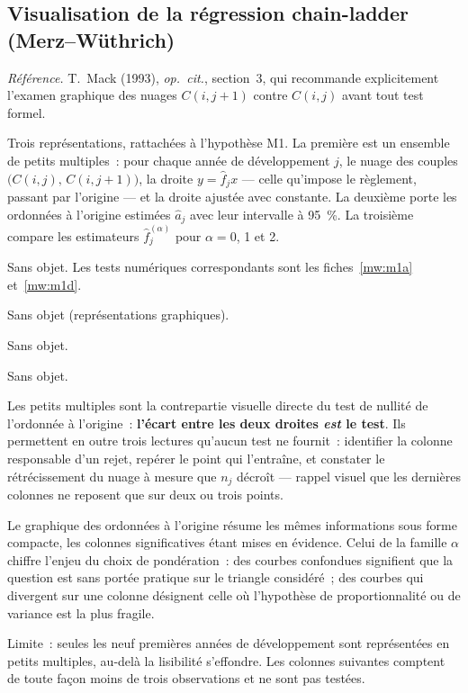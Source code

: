 \documentclass[a4paper,11pt]{article}
\newcommand{\refl}[1]{{\small\textcolor{maincolor!70!black}{\textit{Référence.} #1}}\par\smallskip}
\newcounter{ficheid}
\newenvironment{fiche}[1]{%
  \stepcounter{ficheid}%
  \phantomsection
  \subsection{#1}%
  \label{fiche:\theficheid}%
}{%
  \end{description}\vspace{0.5em}%
}
\newcommand{\Cadre}{%
  \begin{description}[leftmargin=0pt, style=unboxed, itemsep=3pt, topsep=3pt, parsep=2pt]%
  \item[\textcolor{financeblue}{\textbf{1. Cadre, notations et hypothèses de validité (non testées).}}]}
\newcommand{\Hzero}{\item[\textcolor{financeblue}{\textbf{2. Hypothèse nulle.}}]}
\newcommand{\Stat}{\item[\textcolor{financeblue}{\textbf{3. Statistique de test.}}]}
\newcommand{\Loi}{\item[\textcolor{financeblue}{\textbf{4. Loi sous $H_0$.}}]}
\newcommand{\Pval}{\item[\textcolor{financeblue}{\textbf{5. p-value.}}]}
\newcommand{\Usage}{\item[\textcolor{financeblue}{\textbf{6. Usage et limites.}}]}
\begin{document}
\begin{fiche}{Visualisation de la régression chain-ladder (Merz--Wüthrich)}
\label{sec:graph-mw}
\refl{T.~Mack (1993), \emph{op.\ cit.}, section~3, qui recommande explicitement
l'examen graphique des nuages $C(i,j+1)$ contre $C(i,j)$ avant tout test formel.}
\Cadre
Trois représentations, rattachées à l'hypothèse M1. La première est un ensemble
de petits multiples~: pour chaque année de développement $j$, le nuage des
couples $\big(C(i,j),\,C(i,j+1)\big)$, la droite $y = \hat f_j x$ --- celle
qu'impose le règlement, passant par l'origine --- et la droite ajustée avec
constante. La deuxième porte les ordonnées à l'origine estimées $\hat a_j$ avec
leur intervalle à 95~\%. La troisième compare les estimateurs
$\hat f_j^{(\alpha)}$ pour $\alpha = 0$, 1 et 2.
\Hzero
Sans objet. Les tests numériques correspondants sont les fiches~\ref{mw:m1a}
et~\ref{mw:m1d}.
\Stat
Sans objet (représentations graphiques).
\Loi
Sans objet.
\Pval
Sans objet.
\Usage
Les petits multiples sont la contrepartie visuelle directe du test de nullité de
l'ordonnée à l'origine~: \textbf{l'écart entre les deux droites \emph{est} le
test}. Ils permettent en outre trois lectures qu'aucun test ne fournit~:
identifier la colonne responsable d'un rejet, repérer le point qui l'entraîne, et
constater le rétrécissement du nuage à mesure que $n_j$ décroît --- rappel visuel
que les dernières colonnes ne reposent que sur deux ou trois points.

\medskip
Le graphique des ordonnées à l'origine résume les mêmes informations sous forme
compacte, les colonnes significatives étant mises en évidence. Celui de la
famille $\alpha$ chiffre l'enjeu du choix de pondération~: des courbes
confondues signifient que la question est sans portée pratique sur le triangle
considéré~; des courbes qui divergent sur une colonne désignent celle où
l'hypothèse de proportionnalité ou de variance est la plus fragile.

\medskip
Limite~: seules les neuf premières années de développement sont représentées en
petits multiples, au-delà la lisibilité s'effondre. Les colonnes suivantes
comptent de toute façon moins de trois observations et ne sont pas testées.
\end{fiche}
\end{document}
